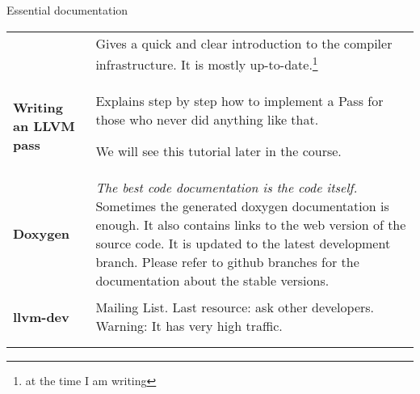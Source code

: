 \begin{frame}[t]{Essential documentation}
	\begin{tabular}{>{\RaggedLeft\arraybackslash}p{}p{}}
	{\textbf{Intro to LLVM}\par\cite{LOCAL:www/llvmIntro}}
		& Gives a quick and clear introduction to the compiler infrastructure.
       It is mostly up-to-date.\footnote{at the time I am writing} \\ \addlinespace[0.4em]
  \textbf{Writing an LLVM pass}\par\cite{LOCAL:www/llvmWritingAPass}
		& Explains step by step how to implement a Pass
       for those who never did anything like that.\par
       We will see this tutorial later in the course. \\ \addlinespace[0.4em]
  \textbf{Doxygen}\par\cite{LOCAL:www/llvmDoxygen}
		& \textit{The best code documentation is the code itself.}
       Sometimes the generated doxygen documentation is enough.
       It also contains links to the web version of the source code.
       It is updated to the latest development branch.
       Please refer to github branches for the documentation about the stable versions. \\ \addlinespace[0.4em]
  \textbf{llvm-dev}\par\cite{LOCAL:www/llvmDoxygen}
  	& Mailing List. Last resource: ask other developers.
       Warning: It has very high traffic.\\ \addlinespace[0.4em]
	\end{tabular}
\end{frame}
